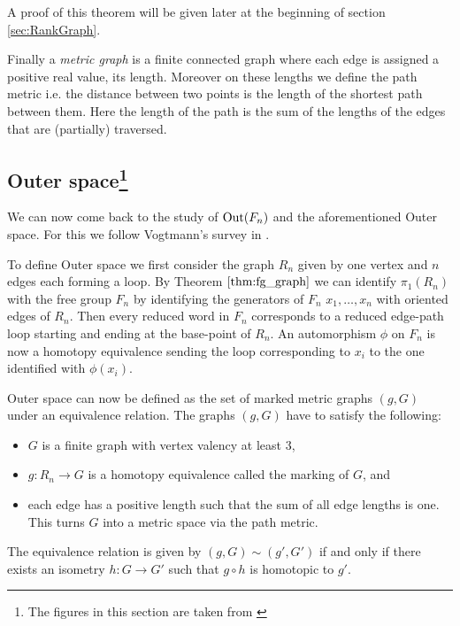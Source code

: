 A proof of this theorem will be given later at the beginning of section \ref{sec:RankGraph}.

Finally a \emph{metric graph} is a finite connected graph where each edge is assigned a positive real value, its length. 
Moreover on these lengths we define the path metric i.e.
the distance between two points is the length of the shortest path between them.
Here the length of the path is the sum of the lengths of the edges that are (partially) traversed.

\subsection{Outer space\footnote{The figures in this section are taken from \cite{vogtmann02}}}
We can now come back to the study of $\operatorname{Out}(F_{n})$ and the aforementioned Outer space. 
For this we follow Vogtmann's survey in \cite{vogtmann02}.

To define Outer space we first consider the graph $R_{n}$ given by one vertex and $n$ edges each forming a loop.
By Theorem $\ref{thm:fg_graph}$ we can identify $\pi_1(R_{n})$ with the free group $F_{n}$ by
identifying the generators of $F_{n}$ $x_1,\ldots,x_{n}$ with oriented edges of $R_{n}$.
Then every reduced word in $F_{n}$ corresponds to a reduced edge-path loop starting and ending at the base-point of $R_{n}$.
An automorphism $\phi$ on $F_{n}$ is now a homotopy equivalence sending the loop corresponding to $x_{i}$
to the one identified with $\phi(x_{i})$.

Outer space can now be defined as the set of marked metric graphs $(g,G)$ under an equivalence relation.
The graphs $(g,G)$ have to satisfy the following:
\begin{itemize}
	\item $G$ is a finite graph with vertex valency at least $3$,
	\item $g: R_{n} \to G$ is a homotopy equivalence called the marking of $G$, and
	\item each edge has a positive length such that the sum of all
		edge lengths is one. This turns $G$ into a metric space via the path metric.
\end{itemize}
The equivalence relation is given by $(g,G) \sim (g',G')$ if and only if 
there exists an isometry $h: G \to G'$ such that $g \circ h$ is homotopic to $g'$.

